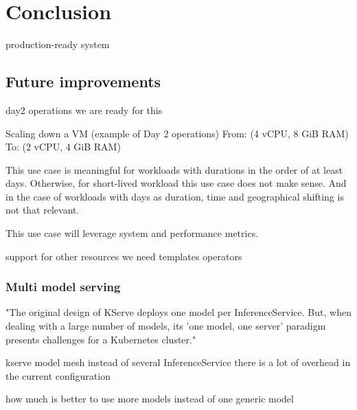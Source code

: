 \chapter{Conclusion}
\label{cha:conclusion}


production-ready system

\section{Future improvements}

day2 operations
we are ready for this

Scaling down a VM (example of Day 2 operations)
From: (4 vCPU, 8 GiB RAM)
To: (2 vCPU, 4 GiB RAM)

This use case is meaningful for workloads with durations in the order of at least days. Otherwise, for short-lived workload this use case does not make sense.
And in the case of workloads with days as duration, time and geographical shifting is not that relevant.

This use case will leverage system and performance metrics.



support for other resources
we need
templates
operators


\subsection{Multi model serving}
"The original design of KServe deploys one model per InferenceService. But, when dealing with a large number of models, its 'one model, one server' paradigm presents challenges for a Kubernetes cluster."

kserve model mesh instead of several InferenceService
there is a lot of overhead in the current configuration

how much is better to use more models instead of one generic model 




\newpage

